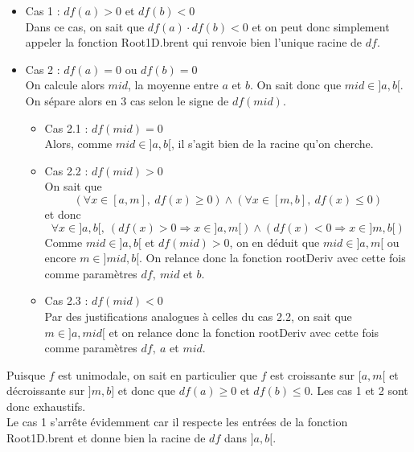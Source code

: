 \documentclass[a4paper, 12pt]{article}
\begin{document}
\begin{itemize}

    \item Cas 1 : \( df(a) > 0 \) et \( df(b) < 0 \) \\
Dans ce cas, on sait que \( df(a) \cdot df(b) < 0 \) et on peut donc simplement appeler la fonction Root1D.brent qui renvoie bien l'unique racine de \( df \).

    \item Cas 2 : \( df(a) = 0 \) ou \( df(b) = 0 \) \\
On calcule alors \( mid \), la moyenne entre \( a \) et \( b \). On sait donc que \( mid \in ]a, b[ \). On sépare alors en 3 cas selon le signe de \( df(mid) \).
    \begin{itemize}

        \item Cas 2.1 : \( df(mid) = 0 \) \\
Alors, comme \( mid \in ]a, b[ \), il s'agit bien de la racine qu'on cherche.

        \item Cas 2.2 : \( df(mid) > 0 \) \\
On sait que
$$
(\forall x \in [a, m],~ df(x) \geq 0) \land (\forall x \in [m, b],~ df(x) \leq 0)
$$
et donc
$$
\forall x \in ]a, b[,~ (df(x) > 0 \Longrightarrow x \in ]a, m[) \land (df(x) < 0 \Longrightarrow x \in ]m, b[)
$$
Comme \( mid \in ]a, b[ \) et \( df(mid) > 0 \), on en déduit que \( mid \in ]a, m[ \) ou encore \( m \in ]mid, b[ \). On relance donc la fonction rootDeriv avec cette fois comme paramètres \( df,~ mid \) et \( b \).

    \item Cas 2.3 : \( df(mid) < 0 \) \\
Par des justifications analogues à celles du cas 2.2, on sait que \( m \in ]a, mid[ \) et on relance donc la fonction rootDeriv avec cette fois comme paramètres \( df,~ a \) et \( mid \).

    \end{itemize}

\end{itemize}
Puisque \( f \) est unimodale, on sait en particulier que \( f \) est croissante sur \( [a, m[ \) et décroissante sur \( ]m, b] \) et donc que \( df(a) \geq 0 \) et \( df(b) \leq 0 \). Les cas 1 et 2 sont donc exhaustifs. \\
Le cas 1 s'arrête évidemment car il respecte les entrées de la fonction Root1D.brent et donne bien la racine de \( df \) dans \( ]a, b[ \). \\
\end{document}
